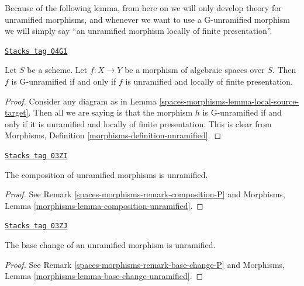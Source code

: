 Because of the following lemma, from here on we will only develop theory
for unramified morphisms, and whenever we want to use a G-unramified
morphism we will simply say ``an unramified morphism locally of finite
presentation''.

\begin{lemma}
\label{spaces-morphisms-lemma-unramified-G-unramified}
\href{https://stacks.math.columbia.edu/tag/04G1}{\texttt{Stacks tag 04G1}}

Let $S$ be a scheme.
Let $f : X \to Y$ be a morphism of algebraic spaces over $S$.
Then $f$ is G-unramified if and only if $f$ is unramified and
locally of finite presentation.
\end{lemma}

\begin{proof}
Consider any diagram as in
Lemma \ref{spaces-morphisms-lemma-local-source-target}.
Then all we are saying is that the morphism $h$ is
G-unramified if and only if it is unramified and locally of finite
presentation. This is clear from
Morphisms, Definition \ref{morphisms-definition-unramified}.
\end{proof}

\begin{lemma}
\label{spaces-morphisms-lemma-composition-unramified}
\href{https://stacks.math.columbia.edu/tag/03ZI}{\texttt{Stacks tag 03ZI}}

The composition of unramified morphisms is unramified.
\end{lemma}

\begin{proof}
See Remark \ref{spaces-morphisms-remark-composition-P} and
Morphisms, Lemma \ref{morphisms-lemma-composition-unramified}.
\end{proof}

\begin{lemma}
\label{spaces-morphisms-lemma-base-change-unramified}
\href{https://stacks.math.columbia.edu/tag/03ZJ}{\texttt{Stacks tag 03ZJ}}

The base change of an unramified morphism is unramified.
\end{lemma}

\begin{proof}
See Remark \ref{spaces-morphisms-remark-base-change-P} and
Morphisms, Lemma \ref{morphisms-lemma-base-change-unramified}.
\end{proof}

